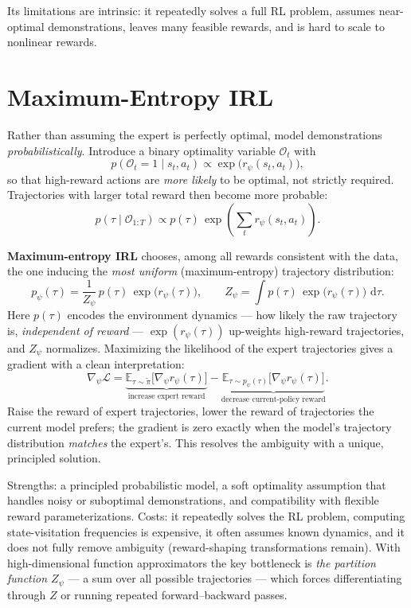 \documentclass[11pt, oneside]{book}
\newcommand{\E}{\mathbb{E}}              %
\newcommand{\grad}{\nabla}               %
\newcommand{\dd}{\,\mathrm{d}}
\newcommand{\loss}{\mathcal{L}}          %
\newcommand{\params}{\boldsymbol{\theta}}   %
\begin{document}
Its limitations are intrinsic: it repeatedly solves a full RL problem, assumes
near-optimal demonstrations, leaves many feasible rewards, and is hard to scale to
nonlinear rewards.

\section{Maximum-Entropy IRL}

Rather than assuming the expert is perfectly optimal, model demonstrations
\emph{probabilistically}. Introduce a binary optimality variable $\mathcal{O}_t$ with
\[
  p(\mathcal{O}_t = 1 \mid s_t, a_t) \propto \exp\bigl(r_\psi(s_t, a_t)\bigr),
\]
so that high-reward actions are \emph{more likely} to be optimal, not strictly required.
Trajectories with larger total reward then become more probable:
\[
  p(\tau \mid \mathcal{O}_{1:T}) \propto p(\tau)\,\exp\!\left(\sum_{t} r_\psi(s_t, a_t)\right).
\]

\textbf{Maximum-entropy IRL} chooses, among all rewards consistent with the data, the one
inducing the \emph{most uniform} (maximum-entropy) trajectory distribution:
\[
  p_\psi(\tau) = \frac{1}{Z_\psi}\, p(\tau)\,\exp\bigl(r_\psi(\tau)\bigr),
  \qquad Z_\psi = \int p(\tau)\,\exp\bigl(r_\psi(\tau)\bigr)\,\dd\tau.
\]
Here $p(\tau)$ encodes the environment dynamics --- how likely the raw trajectory is,
\emph{independent of reward} --- $\exp(r_\psi(\tau))$ up-weights high-reward trajectories,
and $Z_\psi$ normalizes. Maximizing the likelihood of the expert trajectories gives a
gradient with a clean interpretation:
\[
  \grad_\psi \loss
  = \underbrace{\E_{\tau\sim\tilde\pi}\bigl[\grad_\psi r_\psi(\tau)\bigr]}_{\text{increase expert reward}}
  - \underbrace{\E_{\tau\sim p_\psi(\tau)}\bigl[\grad_\psi r_\psi(\tau)\bigr]}_{\text{decrease current-policy reward}}.
\]
Raise the reward of expert trajectories, lower the reward of trajectories the current
model prefers; the gradient is zero exactly when the model's trajectory distribution
\emph{matches} the expert's. This resolves the ambiguity with a unique, principled
solution.

\begin{notebox}[title={MaxEnt IRL: strengths and the partition-function cost}]
Strengths: a principled probabilistic model, a soft optimality assumption that handles
noisy or suboptimal demonstrations, and compatibility with flexible reward
parameterizations. Costs: it repeatedly solves the RL problem, computing state-visitation
frequencies is expensive, it often assumes known dynamics, and it does not fully remove
ambiguity (reward-shaping transformations remain). With high-dimensional function
approximators the key bottleneck is \emph{the partition function $Z_\psi$} --- a sum over
all possible trajectories --- which forces differentiating through $Z$ or running repeated
forward--backward passes.
\end{notebox}
\end{document}
